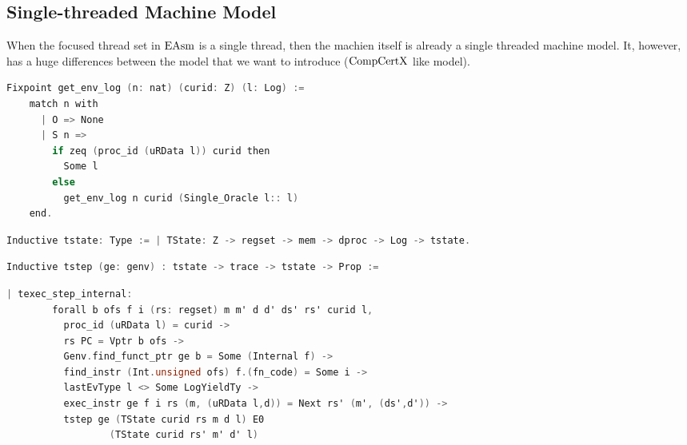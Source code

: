 
\subsection{Single-threaded Machine Model}
\label{chapter:linking:subsec:single-threaded-machine-model}
When the focused thread set in $\mathrm{EAsm}$ is a single thread, then the machien itself is 
already a single threaded machine model. 
It, however, has a huge differences between the model that we want to introduce ($\mathrm{CompCertX}$ like model).

\begin{lstlisting}[language=C]
  Fixpoint get_env_log (n: nat) (curid: Z) (l: Log) :=
    match n with
      | O => None
      | S n =>
        if zeq (proc_id (uRData l)) curid then
          Some l
        else
          get_env_log n curid (Single_Oracle l:: l)
    end.
\end{lstlisting}

\begin{lstlisting}[language=C]
  Inductive tstate: Type := | TState: Z -> regset -> mem -> dproc -> Log -> tstate.
\end{lstlisting}


\begin{lstlisting}[language=C]
  Inductive tstep (ge: genv) : tstate -> trace -> tstate -> Prop :=
\end{lstlisting}

\begin{lstlisting}[language=C]
    | texec_step_internal:
        forall b ofs f i (rs: regset) m m' d d' ds' rs' curid l,
          proc_id (uRData l) = curid ->
          rs PC = Vptr b ofs ->
          Genv.find_funct_ptr ge b = Some (Internal f) ->
          find_instr (Int.unsigned ofs) f.(fn_code) = Some i ->
          lastEvType l <> Some LogYieldTy ->
          exec_instr ge f i rs (m, (uRData l,d)) = Next rs' (m', (ds',d')) ->
          tstep ge (TState curid rs m d l) E0
                  (TState curid rs' m' d' l)
\end{lstlisting}

